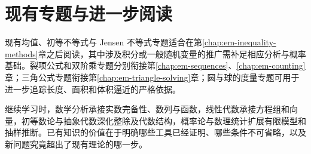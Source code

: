 \section{现有专题与进一步阅读}
现有均值、初等不等式与 Jensen 不等式专题适合在第\ref{chap:em-inequality-methods}章之后阅读，其中涉及积分或一般随机变量的推广需补足相应分析与概率基础。裂项公式和双阶乘专题分别衔接第\ref{chap:em-sequences}、\ref{chap:em-counting}章；三角公式专题衔接第\ref{chap:em-triangle-solving}章；圆与球的度量专题可用于进一步追踪长度、面积和体积逼近的严格依据。

继续学习时，数学分析承接实数完备性、数列与函数，线性代数承接方程组和向量，初等数论与抽象代数深化整除及代数结构，概率论与数理统计扩展有限模型和抽样推断。已有知识的价值在于明确哪些工具已经证明、哪些条件不可省略，以及新问题究竟超出了现有理论的哪一步。

